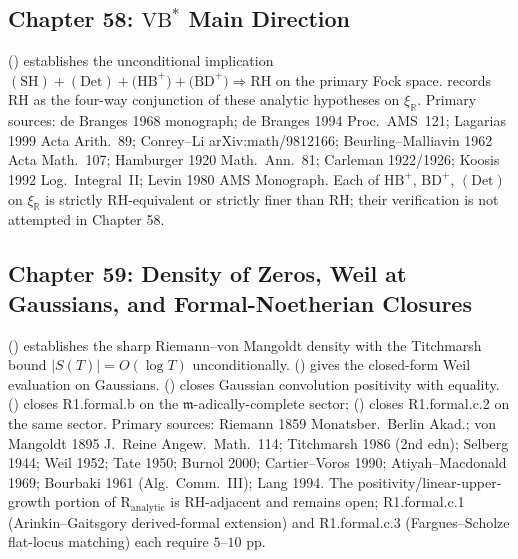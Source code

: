 \subsection{Chapter 58: \(\mathrm{VB}^{*}\) Main Direction}
\label{v4-arith:w5-synth:ch58}

 (\ClaimStatusProvedHere)
establishes the unconditional implication
\(\mathrm{(SH)}+\mathrm{(Det)}+\mathrm{(HB}^{+})+\mathrm{(BD}^{+})
\Rightarrow \mathrm{RH}\) on the primary Fock space.
 records RH as the four-way
conjunction of these analytic hypotheses on \(\xi_{\mathbb{R}}\).
Primary sources: de Branges 1968 monograph; de Branges 1994
Proc.~AMS~121; Lagarias 1999 Acta Arith.~89;
Conrey--Li arXiv:math/9812166; Beurling--Malliavin 1962
Acta Math.~107; Hamburger 1920 Math.~Ann.~81; Carleman 1922/1926;
Koosis 1992 Log.~Integral~II; Levin 1980 AMS Monograph.
Each of \(\mathrm{HB}^{+}\), \(\mathrm{BD}^{+}\), \(\mathrm{(Det)}\)
on \(\xi_{\mathbb{R}}\) is strictly RH-equivalent or strictly finer
than RH; their verification is not attempted in Chapter 58.

\subsection{Chapter 59: Density of Zeros, Weil at Gaussians, and Formal-Noetherian Closures}
\label{v4-arith:w5-synth:ch59}

 (\ClaimStatusProvedHere) establishes
the sharp Riemann--von Mangoldt density with the Titchmarsh bound
\(|S(T)|=O(\log T)\) unconditionally.
 (\ClaimStatusProvedHere)
gives the closed-form Weil evaluation on Gaussians.
 (\ClaimStatusProvedHere) closes
Gaussian convolution positivity with equality.
 (\ClaimStatusProvedHere)
closes R1.formal.b on the \(\mathfrak{m}\)-adically-complete sector;
 (\ClaimStatusProvedHere) closes
R1.formal.c.2 on the same sector.
Primary sources: Riemann 1859 Monatsber.~Berlin Akad.;
von Mangoldt 1895 J.~Reine Angew.~Math.~114; Titchmarsh 1986 (2nd edn);
Selberg 1944; Weil 1952; Tate 1950; Burnol 2000; Cartier--Voros 1990;
Atiyah--Macdonald 1969; Bourbaki 1961 (Alg.~Comm.~III); Lang 1994.
The positivity/linear-upper-growth portion of
\(\mathrm{R}_{\mathrm{analytic}}\) is RH-adjacent and remains open;
R1.formal.c.1 (Arinkin--Gaitsgory derived-formal extension) and
R1.formal.c.3 (Fargues--Scholze flat-locus matching) each require
\(5\)--\(10\) pp.

